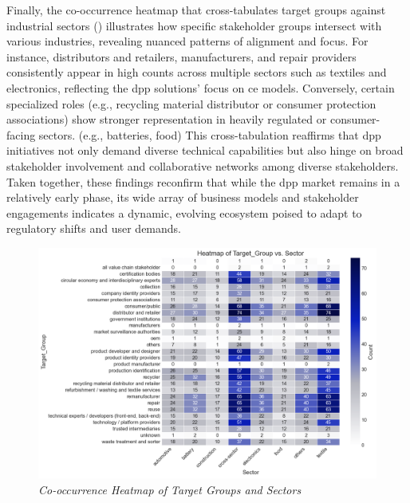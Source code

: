 
Finally, the co-occurrence heatmap that cross-tabulates target groups against industrial sectors  () illustrates how specific stakeholder groups intersect with various industries, revealing nuanced patterns of alignment and focus. For instance, distributors and retailers, manufacturers, and repair providers consistently appear in high counts across multiple sectors such as textiles and electronics, reflecting the \ac{dpp} solutions' focus on \acrlong{ce} models. Conversely, certain specialized roles (e.g., recycling material distributor or consumer protection associations) show stronger representation in heavily regulated or consumer-facing sectors. (e.g., batteries, food) This cross-tabulation reaffirms that \ac{dpp} initiatives not only demand diverse technical capabilities but also hinge on broad stakeholder involvement and collaborative networks among diverse stakeholders. Taken together, these findings reconfirm that while the \ac{dpp} market remains in a relatively early phase, its wide array of business models and stakeholder engagements indicates a dynamic, evolving ecosystem poised to adapt to regulatory shifts and user demands.

\begin{figure}[htbp]
  \centering
  \includegraphics[width=\textwidth]{figures/initiatives_target_group_vs_sector.png}
  \caption{%
    \textit{Co-occurrence Heatmap of Target Groups and Sectors} 
  }
  \label{fig:initiatives_target_group_vs_sector}
\end{figure}

